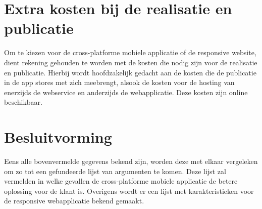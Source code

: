 \section{Extra kosten bij de realisatie en publicatie}
Om te kiezen voor de cross-platforme mobiele applicatie of de responsive website, dient rekening gehouden te worden met de kosten die nodig zijn voor de realisatie en publicatie.
Hierbij wordt hoofdzakelijk gedacht aan de kosten die de publicatie in de app stores met zich meebrengt, alsook de kosten voor de hosting van enerzijds de webservice en
anderzijds de webapplicatie. Deze kosten zijn online beschikbaar.

\section{Besluitvorming}
Eens alle bovenvermelde gegevens bekend zijn, worden deze met elkaar vergeleken om zo tot een gefundeerde lijst van argumenten
te komen. Deze lijst zal vermelden in welke gevallen de cross-platforme mobiele applicatie de betere oplossing voor de klant is.
Overigens wordt er een lijst met karakteristieken voor de responsive webapplicatie bekend gemaakt.
